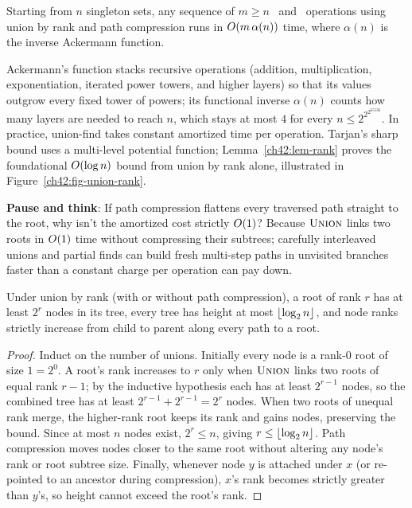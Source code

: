 \begin{theorem}[Tarjan, 1975]
\label{ch42:thm-uf}
Starting from $n$ singleton sets, any sequence of $m \ge n$ \find\ and \union\ operations using union by rank and path compression runs in $O(m\,\alpha(n))$ time, where $\alpha(n)$ is the inverse Ackermann function.
\end{theorem}

Ackermann's function stacks recursive operations (addition, multiplication, exponentiation, iterated power towers, and higher layers) so that its values outgrow every fixed tower of powers; its functional inverse $\alpha(n)$ counts how many layers are needed to reach $n$, which stays at most $4$ for every $n \le 2^{2^{2^{65536}}}$. In practice, union-find takes constant amortized time per operation. Tarjan's sharp bound uses a multi-level potential function; Lemma~\ref{ch42:lem-rank} proves the foundational $O(\log n)$ bound from union by rank alone, illustrated in Figure~\ref{ch42:fig-union-rank}.

\begin{recoverybox}
\textbf{Pause and think}: If path compression flattens every traversed path straight to the root, why isn't the amortized cost strictly $O(1)$? Because $\textsc{Union}$ links two roots in $O(1)$ time without compressing their subtrees; carefully interleaved unions and partial finds can build fresh multi-step paths in unvisited branches faster than a constant charge per operation can pay down.
\end{recoverybox}

\begin{lemma}
\label{ch42:lem-rank}
Under union by rank (with or without path compression), a root of rank $r$ has at least $2^r$ nodes in its tree, every tree has height at most $\lfloor\log_2 n\rfloor$, and node ranks strictly increase from child to parent along every path to a root.
\end{lemma}

\begin{proof}
Induct on the number of unions. Initially every node is a rank-$0$ root of size $1 = 2^0$. A root's rank increases to $r$ only when $\textsc{Union}$ links two roots of equal rank $r-1$; by the inductive hypothesis each has at least $2^{r-1}$ nodes, so the combined tree has at least $2^{r-1} + 2^{r-1} = 2^r$ nodes. When two roots of unequal rank merge, the higher-rank root keeps its rank and gains nodes, preserving the bound. Since at most $n$ nodes exist, $2^r \le n$, giving $r \le \lfloor\log_2 n\rfloor$. Path compression moves nodes closer to the same root without altering any node's rank or root subtree size. Finally, whenever node $y$ is attached under $x$ (or re-pointed to an ancestor during compression), $x$'s rank becomes strictly greater than $y$'s, so height cannot exceed the root's rank.
\end{proof}

